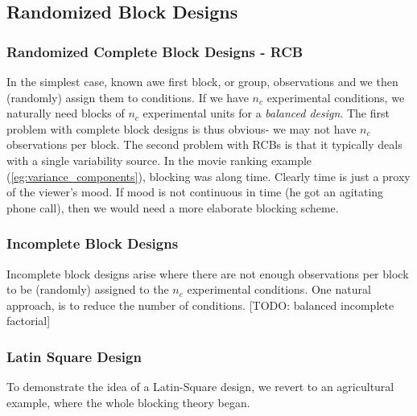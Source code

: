 \subsection{Randomized Block Designs}


\subsubsection{Randomized Complete Block Designs - RCB}
In the simplest case, known awe first block, or group, observations and we then (randomly) assign them to conditions.
If we have $n_c$ experimental conditions, we naturally need blocks of $n_c$ experimental units for a \emph{balanced design}.
The first problem with complete block designs is thus obvious- we may not have $n_c$ observations per block.
The second problem with RCBs is that it typically deals with a single variability source. 
In the movie ranking example (\ref{eg:variance_components}), blocking was along time. 
Clearly time is just a proxy of the viewer's mood. 
If mood is not continuous in time (he got an agitating phone call), then we would need a more elaborate blocking scheme.


\subsubsection{Incomplete Block Designs}
Incomplete block designs arise where there are not enough observations per block to be (randomly) assigned to the $n_c$ experimental conditions.
One natural approach, is to reduce the number of conditions. 
[TODO: balanced incomplete factorial]


\subsubsection{Latin Square Design}
To demonstrate the idea of a Latin-Square design, we revert to an agricultural example, where the whole blocking theory began.

